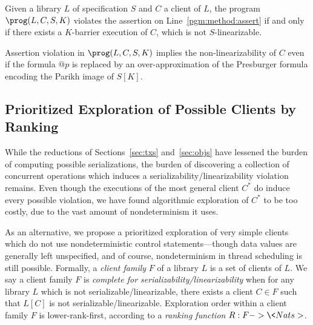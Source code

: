 \vspace{-1mm}
\begin{theorem}\label{th:transl_linear}
Given a library $L$ of specification $S$ and $C$ a client of $L$, the program $\prog(L,C,S,K)$ violates the assertion on Line~\ref{pgm:method:assert} if and only if there exists a $K$-barrier execution of $C$, which is not $S$-linearizable.
\vspace{-1mm}
\end{theorem}

Assertion violation in $\prog(L,C,S,K)$ implies the non-linearizability of $C$ even if the formula $@p$ is replaced by an over-approximation of the Presburger formula encoding the Parikh image of $S[K]$. 


\subsection{Prioritized Exploration of Possible Clients by Ranking}
\label{sec:clients}

While the reductions of Sections~\ref{sec:txs} and~\ref{sec:objs} have lessened
the burden of computing possible serializations, the burden of discovering a
collection of concurrent operations which induces a
serializability/linearizability violation remains. Even though the executions
of the most general client $C^\ast$ do induce every possible violation, we have
found algorithmic exploration of $C^\ast$ to be too costly, due to the vast
amount of nondeterminism it uses.

As an alternative, we propose a prioritized exploration of very simple clients
which do not use nondeterministic control statements---though data values are
generally left unspecified, and of course, nondeterminism in thread scheduling
is still possible. Formally, a \emph{client family} $F$ of a library $L$ is a
set of clients of $L$. We say a client family $F$ is \emph{complete for
serializability/linearizability} when for any library $L$ which is not
serializable/linearizable, there exists a client $C \in F$ such that $L[C]$ is
not serializable/linearizable. Exploration order within a client family $F$ is
lower-rank-first, according to a \emph{ranking function} $R : F -> \<Nats>$.

